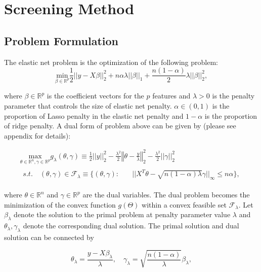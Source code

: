 

\section{Screening Method}
\subsection{Problem Formulation}

The elastic net problem is the optimization of the following problem:
\begin{equation}
    \label{eq:enet}
    \underset{\beta\in \mathbb{R}^p}{\mathrm{min}}\frac{1}{2}||y-X\beta||_2^2+n\alpha\lambda||\beta||_1+\frac{n(1-\alpha)}{2}\lambda||\beta||_2^2,
\end{equation}

where $\beta\in\mathbb{R}^p$ is the coefficient vectors for the $p$ features and $\lambda>0$ is the penalty parameter that controls the size of elastic net penalty. $\alpha\in(0,1)$ is the proportion of Lasso penalty in the elastic net penalty and $1-\alpha$ is the proportion of ridge penalty. A dual form of problem above can be given by (please see appendix for details):

\begin{gather}
        \label{eq:dualtheta}
        \underset{\theta\in \mathbb{R}^{ n},\gamma\in\mathbb{R}^p}{\mathrm{max}}g_\lambda(\theta,\gamma)\equiv\frac{1}{2}||y||_2^2-\frac{\lambda^2}{2}\left\Vert\theta-\frac{y}{\lambda}\right\Vert_2^2-\frac{\lambda^2}{2}||\gamma||_2^2\\
        \begin{aligned}s.t.\quad (\theta,\gamma)\in \mathcal{F}_\lambda\equiv\{(\theta,\gamma):\quad
            &||X^T\theta-\sqrt{n(1-\alpha)\lambda}\gamma||_\infty\leq n\alpha\}\nonumber,
        \end{aligned}
\end{gather}

where $\theta\in \mathbb{R}^{n}$ and $\gamma\in\mathbb{R}^p$ are the dual variables. The dual problem becomes the minimization of the convex function $g(\Theta)$ within a convex feasible set $\mathcal{F}_\lambda$. Let $\beta_\lambda$ denote the solution to the primal problem at penalty parameter value $\lambda$ and $\theta_{\lambda},\gamma_\lambda$ denote the corresponding dual solution. The primal solution and dual solution can be connected by

\begin{equation}
    \label{eq:dualprimal}
    \theta_\lambda=\frac{y-X\beta_\lambda}{\lambda},\quad \gamma_\lambda=\sqrt{\frac{n(1-\alpha)}{\lambda}}\beta_\lambda,
\end{equation}

